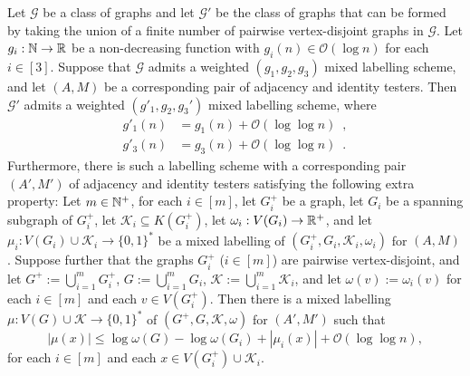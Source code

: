 \documentclass{patmorin}
\renewcommand{\le}{\leqslant}
\newcommand{\pat}[1]{\textcolor{Magenta}{PaMo: #1}}
\newcommand{\gwen}[1]{\textcolor{Purple}{GJ: #1}}
\newcommand{\Oh}{\mathcal{O}}
\begin{document}


\begin{lem}\label{disjoint_union_iii}
   Let $\mathcal{G}$ be a class of graphs and let $\mathcal{G}'$ be the class of graphs that can be formed by taking the union of a finite number of pairwise vertex-disjoint graphs in $\mathcal{G}$.
    Let $g_i:\mathbb{N}\to\mathbb{R}$ be a non-decreasing function  with $g_i(n)\in \Oh(\log n)$ for each $i\in[3]$.
    Suppose that $\mathcal{G}$ admits a weighted $(g_1,g_2,g_3)$ mixed labelling scheme, and let $(A, M)$ be a corresponding pair of adjacency and identity testers.
    Then $\mathcal{G}'$ admits a weighted $(g'_1,g_2,g_3')$ mixed labelling scheme, where
    \begin{align*}
        g'_1(n) & = g_1(n)+\Oh(\log\log n)\enspace, \\
        g'_3(n) & = g_3(n)+\Oh(\log\log n) \enspace .
    \end{align*}
    Furthermore, there is such a labelling scheme with a corresponding pair $(A', M')$ of adjacency and identity testers satisfying the following extra property:
    Let $m\in\mathbb{N}^+$, for each $i\in[m]$, let $G^+_i$ be a graph, let $G_i$ be a spanning subgraph of $G^+_i$, let $\mathcal{K}_i\subseteq K(G^+_i)$,
    let $\omega_i:V(G_i)\to\mathbb{R}^+$, and let $\mu_i:V(G_i)\cup\mathcal{K}_i\to\{0,1\}^*$ be a mixed labelling of $(G^+_i,G_i,\mathcal{K}_i,\omega_i)$ for $(A, M)$.
    Suppose further that the graphs $G^+_i$ ($i\in [m]$) are pairwise vertex-disjoint, and
    let $G^+:=\bigcup_{i=1}^m G^+_i$, $G:=\bigcup_{i=1}^m G_i$, $\mathcal{K}:=\bigcup_{i=1}^m \mathcal{K}_i$, and let $\omega(v):=\omega_i(v)$ for each $i\in[m]$ and each $v\in V(G^+_i)$.
    Then there is a mixed labelling $\mu:V(G)\cup\mathcal{K}\to \{0,1\}^*$ of $(G^+, G, \mathcal{K}, \omega)$ for $(A', M')$ such that
    \[
    |\mu(x)|\le \log\omega(G)-\log\omega(G_i)+ |\mu_i(x)| + \Oh(\log\log n),
    \]
    for each $i\in [m]$ and each $x\in V(G^+_i)\cup \mathcal{K}_i$.
  \end{lem}

\end{document}
